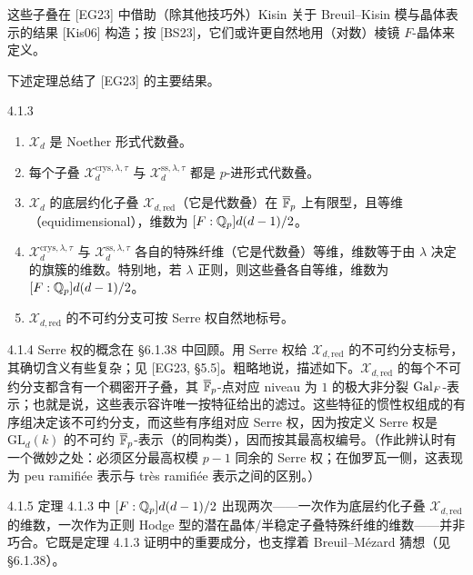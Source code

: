 这些子叠在 [EG23] 中借助（除其他技巧外）Kisin 关于 Breuil--Kisin 模与晶体表示的结果 [Kis06] 构造；按 [BS23]，它们或许更自然地用（对数）棱镜 $F$-晶体来定义。

下述定理总结了 [EG23] 的主要结果。

\begin{thm}{4.1.3}\label{thm:a4-4-1-3}
\begin{enumerate}[label=(\arabic*),leftmargin=2.4em,itemsep=0.15em]
\item $\mathcal X_d$ 是 Noether 形式代数叠。
\item 每个子叠 $\mathcal X_d^{\mathrm{crys},\lambda,\tau}$ 与 $\mathcal X_d^{\mathrm{ss},\lambda,\tau}$ 都是 $p$-进形式代数叠。
\item $\mathcal X_d$ 的底层约化子叠 $\mathcal X_{d,\mathrm{red}}$（它是代数叠）在 $\overline{\mathbb{F}}_p$ 上有限型，且等维（equidimensional），维数为 $[F:\mathbb{Q}_p]d(d-1)/2$。
\item $\mathcal X_d^{\mathrm{crys},\lambda,\tau}$ 与 $\mathcal X_d^{\mathrm{ss},\lambda,\tau}$ 各自的特殊纤维（它是代数叠）等维，维数等于由 $\lambda$ 决定的旗簇的维数。特别地，若 $\lambda$ 正则，则这些叠各自等维，维数为 $[F:\mathbb{Q}_p]d(d-1)/2$。
\item $\mathcal X_{d,\mathrm{red}}$ 的不可约分支可按 Serre 权自然地标号。
\end{enumerate}
\end{thm}

\begin{rem}{4.1.4}
Serre 权的概念在 §6.1.38 中回顾。用 Serre 权给 $\mathcal X_{d,\mathrm{red}}$ 的不可约分支标号，其确切含义有些复杂；见 [EG23, §5.5]。粗略地说，描述如下。$\mathcal X_{d,\mathrm{red}}$ 的每个不可约分支都含有一个稠密开子叠，其 $\overline{\mathbb{F}}_p$-点对应 niveau 为 $1$ 的极大非分裂 $\operatorname{Gal}_F$-表示；也就是说，这些表示容许唯一按特征给出的滤过。这些特征的惯性权组成的有序组决定该不可约分支，而这些有序组对应 Serre 权，因为按定义 Serre 权是 $\mathrm{GL}_d(k)$ 的不可约 $\overline{\mathbb{F}}_p$-表示（的同构类），因而按其最高权编号。（作此辨认时有一个微妙之处：必须区分最高权模 $p-1$ 同余的 Serre 权；在伽罗瓦一侧，这表现为 peu ramifiée 表示与 très ramifiée 表示之间的区别。）
\end{rem}

\begin{rem}{4.1.5}
定理 4.1.3 中 $[F:\mathbb{Q}_p]d(d-1)/2$ 出现两次——一次作为底层约化子叠 $\mathcal X_{d,\mathrm{red}}$ 的维数，一次作为正则 Hodge 型的潜在晶体/半稳定子叠特殊纤维的维数——并非巧合。它既是定理 4.1.3 证明中的重要成分，也支撑着 Breuil--Mézard 猜想（见 §6.1.38）。
\end{rem}

